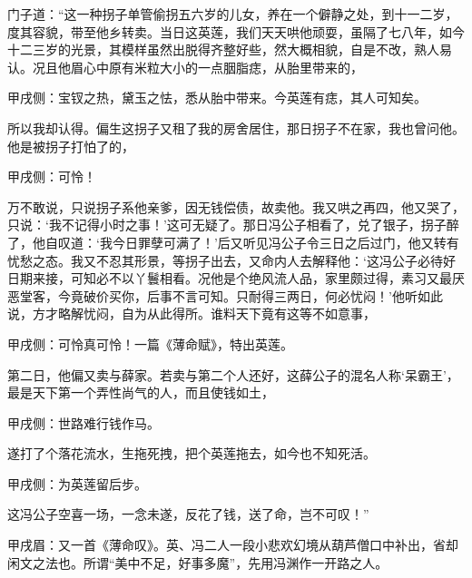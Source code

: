 \begin{parag}
    门子道：“这一种拐子单管偷拐五六岁的儿女，养在一个僻静之处，到十一二岁，度其容貌，带至他乡转卖。当日这英莲，我们天天哄他顽耍，虽隔了七八年，如今十二三岁的光景，其模样虽然出脱得齐整好些，然大概相貌，自是不改，熟人易认。况且他眉心中原有米粒大小的一点胭脂痣，从胎里带来的，\begin{note}甲戌侧：宝钗之热，黛玉之怯，悉从胎中带来。今英莲有痣，其人可知矣。\end{note}所以我却认得。偏生这拐子又租了我的房舍居住，那日拐子不在家，我也曾问他。他是被拐子打怕了的，\begin{note}甲戌侧：可怜！\end{note}万不敢说，只说拐子系他亲爹，因无钱偿债，故卖他。我又哄之再四，他又哭了，只说：‘我不记得小时之事！’这可无疑了。那日冯公子相看了，兑了银子，拐子醉了，他自叹道：‘我今日罪孽可满了！’后又听见冯公子令三日之后过门，他又转有忧愁之态。我又不忍其形景，等拐子出去，又命内人去解释他：‘这冯公子必待好日期来接，可知必不以丫鬟相看。况他是个绝风流人品，家里颇过得，素习又最厌恶堂客，今竟破价买你，后事不言可知。只耐得三两日，何必忧闷！’他听如此说，方才略解忧闷，自为从此得所。谁料天下竟有这等不如意事，\begin{note}甲戌侧：可怜真可怜！一篇《薄命赋》，特出英莲。\end{note}第二日，他偏又卖与薛家。若卖与第二个人还好，这薛公子的混名人称‘呆霸王’，最是天下第一个弄性尚气的人，而且使钱如土，\begin{note}甲戌侧：世路难行钱作马。\end{note}遂打了个落花流水，生拖死拽，把个英莲拖去，如今也不知死活。\begin{note}甲戌侧：为英莲留后步。\end{note}这冯公子空喜一场，一念未遂，反花了钱，送了命，岂不可叹！”\begin{note}甲戌眉：又一首《薄命叹》。英、冯二人一段小悲欢幻境从葫芦僧口中补出，省却闲文之法也。所谓“美中不足，好事多魔”，先用冯渊作一开路之人。\end{note}
\end{parag}


